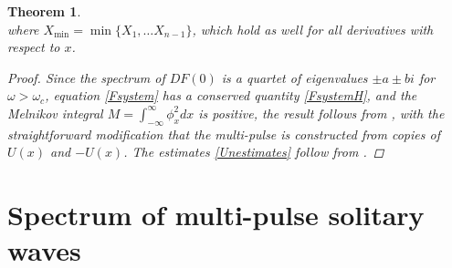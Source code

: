 \documentclass[12pt]{elsarticle}
\newtheorem{theorem}{Theorem}
\begin{document}
\begin{theorem}
\begin{equation}
\end{equation}
where $X_{\mathrm{min}} = \min \{ X_1, \dots X_{n-1} \}$, which hold as well for all derivatives with respect to $x$.
\begin{proof}
Since the spectrum of $DF(0)$ is a quartet of eigenvalues $\pm a \pm b i$ for $\omega > \omega_c$, equation \cref{Fsystem} has a conserved quantity \cref{FsystemH}, and the Melnikov integral $M = \int_{-\infty}^\infty \phi_x^2 dx$ is positive, the result follows from \cite[Theorem~3.6]{SandstedeStrut}, with the straightforward modification that the multi-pulse is constructed from copies of $U(x)$ and $-U(x)$. The estimates \cref{Unestimates} follow from \cite{Sandstede1993,Sandstede1998}.
\end{proof}
\end{theorem}

\section{Spectrum of multi-pulse solitary waves}\label{sec:multieig}
\end{document}
